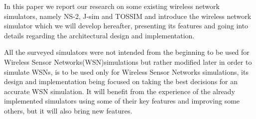 In this paper we report our research on some existing wireless network
simulators, namely NS-2, J-sim and TOSSIM and introduce \codename the 
wireless network simulator which we will develop hereafter, presenting its 
features and going into details regarding the architectural design and implementation.

All the surveyed simulators were not intended from the beginning to be
used for Wireless Sensor Networks(WSN)simulations but rather modified later in
order to simulate WSNs, 
\codename is to be used only 
for Wireless Sensor Networks simulations, its design and
implementation being focused on taking the best decisions for an accurate WSN
simulation. It will benefit from the experience of the already implemented
simulators using some of their key features and improving some others, but
it will also bring new features.

